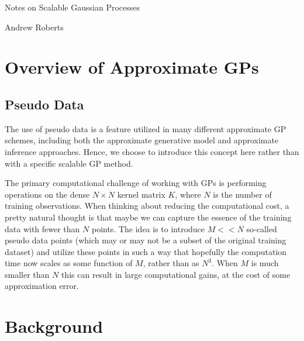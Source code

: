\documentclass[12pt]{article}
\begin{document}
\begin{center}
\Large
Notes on Scalable Gaussian Processes
\end{center}

\begin{flushright}
Andrew Roberts
\end{flushright} 

\section{Overview of Approximate GPs}

\subsection{Pseudo Data}
The use of pseudo data is a feature utilized in many different approximate GP schemes, including both the approximate generative model and approximate inference approaches. Hence, we choose to introduce 
this concept here rather than with a specific scalable GP method.

The primary computational challenge of working with GPs is performing operations on the dense $N \times N$ kernel matrix $K$, where $N$ is the number of training observations. When thinking about 
reducing the computational cost, a pretty natural thought is that maybe we can capture the essence of the training data with fewer than $N$ points. The idea is to introduce 
$M << N$ so-called pseudo data points (which may or may not be a subset of the original training dataset) and utilize these points in such a way that hopefully the computation time now scales as some function 
of $M$, rather than as $N^3$. When $M$ is much smaller than $N$ this can result in large computational gains, at the cost of some approximation error.

\section{Background}

\end{document}
